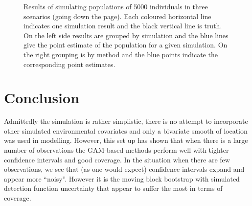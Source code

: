 \documentclass[11pt]{amsart}
\begin{document}
\begin{figure}
\begin{center}
\setlength{\tabcolsep}{0mm}
%
%
\caption{Results of simulating populations of 5000 individuals in three scenarios (going down the page). Each coloured horizontal line indicates one simulation result and the black vertical line is truth. On the left side results are grouped by simulation and the blue lines give the point estimate of the population for a given simulation. On the right grouping is by method and the blue points indicate the corresponding point estimates.}
\label{res-500}
\end{center}
\end{figure}

\section{Conclusion}

Admittedly the simulation is rather simplistic, there is no attempt to incorporate other simulated environmental covariates and only a bivariate smooth of location was used in modelling. However, this set up has shown that when there is a large number of observations the GAM-based methods perform well with tighter confidence intervals and good coverage. In the situation when there are few observations, we see that (as one would expect) confidence intervals expand and appear more ``noisy''. However it is the moving block bootstrap with simulated detection function uncertainty that appear to suffer the most in terms of coverage.



\end{document}

